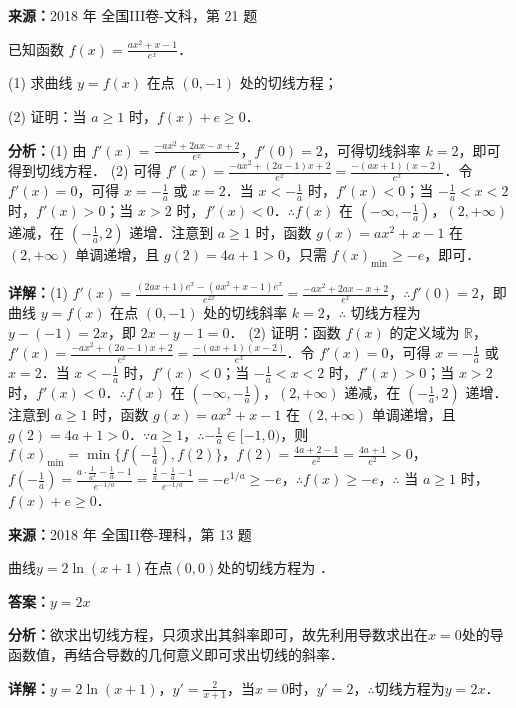 \begin{question}[points=12]
\textbf{来源：}2018 年 全国III卷-文科，第 21 题\par
已知函数 $f(x)=\frac{ax^2+x-1}{e^x}$．

(1) 求曲线 $y=f(x)$ 在点 $(0,-1)$ 处的切线方程；

(2) 证明：当 $a\ge 1$ 时，$f(x)+e\ge 0$．
\begin{solution}

\textbf{分析：}(1) 由 $f'(x)=\frac{-ax^2+2ax-x+2}{e^x}$，$f'(0)=2$，可得切线斜率 $k=2$，即可得到切线方程．
(2) 可得 $f'(x)=\frac{-ax^2+(2a-1)x+2}{e^x}=\frac{-(ax+1)(x-2)}{e^x}$．令 $f'(x)=0$，可得 $x=-\frac{1}{a}$ 或 $x=2$．当 $x<-\frac{1}{a}$ 时，$f'(x)<0$；当 $-\frac{1}{a}<x<2$ 时，$f'(x)>0$；当 $x>2$ 时，$f'(x)<0$．$\therefore f(x)$ 在 $(-\infty,-\frac{1}{a})$，$(2,+\infty)$ 递减，在 $(-\frac{1}{a},2)$ 递增．注意到 $a\ge 1$ 时，函数 $g(x)=ax^2+x-1$ 在 $(2,+\infty)$ 单调递增，且 $g(2)=4a+1>0$，只需 $f(x)_{\min}\ge -e$，即可．

\textbf{详解：}(1) $f'(x)=\frac{(2ax+1)e^x-(ax^2+x-1)e^x}{e^{2x}}=\frac{-ax^2+2ax-x+2}{e^x}$，$\therefore f'(0)=2$，即曲线 $y=f(x)$ 在点 $(0,-1)$ 处的切线斜率 $k=2$，$\therefore$ 切线方程为 $y-(-1)=2x$，即 $2x-y-1=0$．
(2) 证明：函数 $f(x)$ 的定义域为 $\mathbb{R}$，$f'(x)=\frac{-ax^2+(2a-1)x+2}{e^x}=\frac{-(ax+1)(x-2)}{e^x}$．令 $f'(x)=0$，可得 $x=-\frac{1}{a}$ 或 $x=2$．当 $x<-\frac{1}{a}$ 时，$f'(x)<0$；当 $-\frac{1}{a}<x<2$ 时，$f'(x)>0$；当 $x>2$ 时，$f'(x)<0$．$\therefore f(x)$ 在 $(-\infty,-\frac{1}{a})$，$(2,+\infty)$ 递减，在 $(-\frac{1}{a},2)$ 递增．注意到 $a\ge 1$ 时，函数 $g(x)=ax^2+x-1$ 在 $(2,+\infty)$ 单调递增，且 $g(2)=4a+1>0$．$\because a\ge 1$，$\therefore -\frac{1}{a}\in[-1,0)$，则 $f(x)_{\min}=\min\{f(-\frac{1}{a}),f(2)\}$，$f(2)=\frac{4a+2-1}{e^2}=\frac{4a+1}{e^2}>0$，$f(-\frac{1}{a})=\frac{a\cdot\frac{1}{a^2}-\frac{1}{a}-1}{e^{-1/a}}=\frac{\frac{1}{a}-\frac{1}{a}-1}{e^{-1/a}}=-e^{1/a}\ge -e$，$\therefore f(x)\ge -e$，$\therefore$ 当 $a\ge 1$ 时，$f(x)+e\ge 0$．
\end{solution}
\end{question}

\begin{question}[points=5]
\textbf{来源：}2018 年 全国II卷-理科，第 13 题\par
曲线$y=2\ln(x+1)$在点$(0,0)$处的切线方程为                   ．
\fillin[{$y=2x$}]
\begin{solution}
\textbf{答案：}$y=2x$

\textbf{分析：}欲求出切线方程，只须求出其斜率即可，故先利用导数求出在$x=0$处的导函数值，再结合导数的几何意义即可求出切线的斜率．

\textbf{详解：}$y=2\ln(x+1)$，$y'=\frac{2}{x+1}$，当$x=0$时，$y'=2$，$\therefore$切线方程为$y=2x$．
\end{solution}
\end{question}

